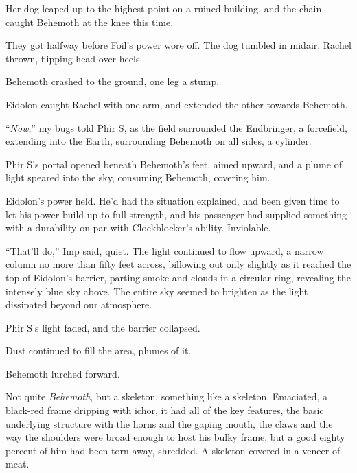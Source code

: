 Her dog leaped up to the highest point on a ruined building, and the chain caught Behemoth at the knee this time.



They got halfway before Foil's power wore off.  The dog tumbled in midair, Rachel thrown, flipping head over heels.



Behemoth crashed to the ground, one leg a stump.



Eidolon caught Rachel with one arm, and extended the other towards Behemoth.



``\emph{Now},'' my bugs told Phir S, as the field surrounded the Endbringer, a forcefield, extending into the Earth, surrounding Behemoth on all sides, a cylinder.



Phir S's portal opened beneath Behemoth's feet, aimed upward, and a plume of light speared into the sky, consuming Behemoth, covering him.



Eidolon's power held.  He'd had the situation explained, had been given time to let his power build up to full strength, and his passenger had supplied something with a durability on par with Clockblocker's ability.  Inviolable.



``That'll do,'' Imp said, quiet.  The light continued to flow upward, a narrow column no more than fifty feet across, billowing out only slightly as it reached the top of Eidolon's barrier, parting smoke and clouds in a circular ring, revealing the intensely blue sky above.  The entire sky seemed to brighten as the light dissipated beyond our atmosphere.



Phir S's light faded, and the barrier collapsed.



Dust continued to fill the area, plumes of it.



Behemoth lurched forward.



Not quite \emph{Behemoth}, but a skeleton, something like a skeleton.  Emaciated, a black-red frame dripping with ichor, it had all of the key features, the basic underlying structure with the horns and the gaping mouth, the claws and the way the shoulders were broad enough to host his bulky frame, but a good eighty percent of him had been torn away, shredded.  A skeleton covered in a veneer of meat.




